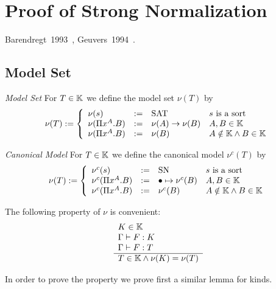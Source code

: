 \section{Proof of Strong Normalization}

Barendregt~1993~\cite{barendregt1993}, Geuvers~1994~\cite{geuvers1994}.




\subsection{Model Set}

\begin{definition}
    \emph{Model Set} For $T \in \mathbb{K}$ we define the model set
    $\nu(T)$ by
    $$
        \nu(T) :=
        \left \{
        \begin{array}{llll}
            \nu(s) &:=& \text{SAT} & s \text{ is a sort}
            \\
            \nu(\Pi x^A. B) &:=& \nu(A)\to \nu(B) & A,B \in \mathbb{K}
            \\
            \nu(\Pi x^A. B) &:=& \nu(B) & A \notin \mathbb{K} \land B \in \mathbb{K}
        \end{array}
        \right.
    $$
\end{definition}



\begin{definition}
    \emph{Canonical Model} For $T \in \mathbb{K}$ we define the
    canonical model $\nu^c(T)$ by
    $$
        \nu(T) :=
        \left \{
        \begin{array}{llll}
            \nu^c(s) &:=& \text{SN} & s \text{ is a sort}
            \\
            \nu^c(\Pi x^A. B)
            &:=&
            \bullet \mapsto \nu^c(B) & A,B \in \mathbb{K}
            \\
            \nu^c(\Pi x^A. B)
            &:=&
            \nu^c(B) & A \notin \mathbb{K} \land B \in \mathbb{K}
        \end{array}
        \right.
    $$
\end{definition}


The following property of $\nu$ is convenient:
$$
    \begin{array}{l} 
        K \in \mathbb{K}
        \\
        \Gamma \vdash F: K
        \\
        \Gamma \vdash F: T
     \\ \hline 
        T \in \mathbb{K} \land \nu(K) = \nu(T)
    \end{array}
$$


In order to prove the property we prove first a similar lemma for kinds.

